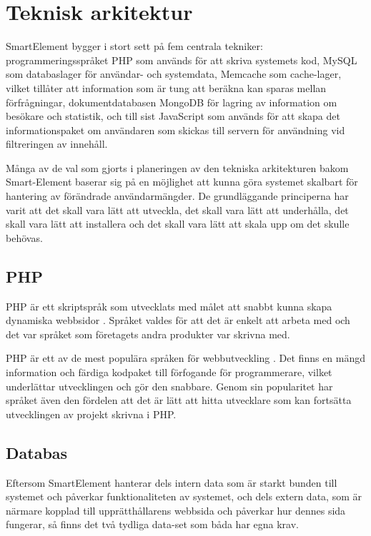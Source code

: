 \section{Teknisk arkitektur}

SmartElement bygger i stort sett på fem centrala tekniker: programmeringsspråket PHP som används för att skriva systemets kod, MySQL som databaslager för användar- och systemdata, Memcache som cache-lager, vilket tillåter att information som är tung att beräkna kan sparas mellan förfrågningar, dokumentdatabasen MongoDB för lagring av information om besökare och statistik, och till sist JavaScript som används för att skapa det informationspaket om användaren som skickas till servern för användning vid filtreringen av innehåll.

Många av de val som gjorts i planeringen av den tekniska arkitekturen bakom Smart-Element baserar sig på en möjlighet att kunna göra systemet skalbart för hantering av förändrade användarmängder. De grundläggande principerna har varit att det skall vara lätt att utveckla, det skall vara lätt att underhålla, det skall vara lätt att installera och det skall vara lätt att skala upp om det skulle behövas.

\subsection{PHP}

PHP är ett skriptspråk som utvecklats med målet att snabbt kunna skapa dynamiska webbsidor \citep{phpmanual}. Språket valdes för att det är enkelt att arbeta med och det var språket som företagets andra produkter var skrivna med.

PHP är ett av de mest populära språken för webbutveckling \citep{tiobe}. Det finns en mängd information och färdiga kodpaket till förfogande för programmerare, vilket underlättar utvecklingen och gör den snabbare. Genom sin popularitet har språket även den fördelen att det är lätt att hitta utvecklare som kan fortsätta utvecklingen av projekt skrivna i PHP.

\subsection{Databas}

Eftersom SmartElement hanterar dels intern data som är starkt bunden till systemet och påverkar funktionaliteten av systemet, och dels extern data, som är närmare kopplad till upprätthållarens webbsida och påverkar hur dennes sida fungerar, så finns det två tydliga data-set som båda har egna krav.

